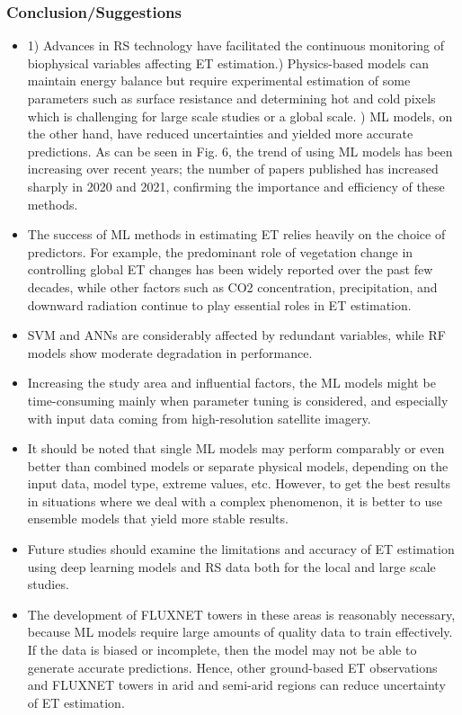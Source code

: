 \documentclass[paper=a4, fontsize=12pt]{scrartcl}
\begin{document}
	\subsubsection{Conclusion/Suggestions}
	\begin{itemize}
		\item  1) Advances in RS technology have facilitated the continuous monitoring of biophysical variables affecting ET estimation.) Physics-based models can maintain energy balance but require experimental estimation of some parameters such as surface resistance and determining hot and cold pixels which is challenging for large scale studies or a global scale. ) ML models, on the other hand, have reduced uncertainties and yielded more accurate predictions. As can be seen in Fig. 6, the trend of using ML models has been increasing over recent years; the number of papers published has increased sharply in 2020 and 2021, confirming the importance and efficiency of these methods.
		\item The success of ML methods in estimating ET relies heavily on the choice of predictors. For example, the predominant role of vegetation change in controlling global ET changes has been widely reported over the past few decades, while other factors such as CO2 concentration, precipitation, and downward radiation continue to play essential roles in ET estimation.
		\item SVM and ANNs are considerably affected by redundant variables, while RF models show moderate degradation in performance.
		\item Increasing the study area and influential factors, the ML models might be time-consuming mainly when parameter tuning is considered, and especially with input data coming from high-resolution satellite imagery.
		\item It should be noted that single ML models may perform comparably or even better than combined models or separate physical models, depending on the input data, model type, extreme values, etc. However, to get the best results in situations where we deal with a complex phenomenon, it is better to use ensemble models that yield more stable results.
		\item Future studies should examine the limitations and accuracy of ET estimation using deep learning models and RS data both for the local and large scale studies.
		\item The development of FLUXNET towers in these areas is reasonably necessary, because ML models require large amounts of quality data to train effectively. If the data is biased or incomplete, then the model may not be able to generate accurate predictions. Hence, other ground-based ET observations and FLUXNET towers in arid and semi-arid regions can reduce uncertainty of ET estimation.
	\end{itemize}
	
\end{document}
